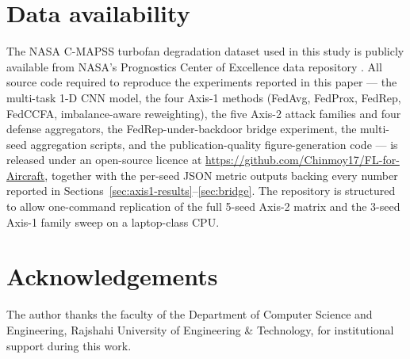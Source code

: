 \documentclass[preprint,12pt,authoryear]{elsarticle}
\begin{document}
\section*{Data availability}
The NASA C-MAPSS turbofan degradation dataset used in this study is
publicly available from NASA's Prognostics Center of Excellence data
repository \citep{Saxena2008CMAPSS}. All source code required to
reproduce the experiments reported in this paper --- the multi-task
1-D CNN model, the four Axis-1 methods (FedAvg, FedProx, FedRep,
FedCCFA, imbalance-aware reweighting), the five Axis-2 attack
families and four defense aggregators, the FedRep-under-backdoor
bridge experiment, the multi-seed aggregation scripts, and the
publication-quality figure-generation code --- is released under
an open-source licence at
\url{https://github.com/Chinmoy17/FL-for-Aircraft}, together with
the per-seed JSON metric outputs backing every number reported in
Sections~\ref{sec:axis1-results}--\ref{sec:bridge}. The repository
is structured to allow one-command replication of the full 5-seed
Axis-2 matrix and the 3-seed Axis-1 family sweep on a laptop-class
CPU.

\section*{Acknowledgements}
The author thanks the faculty of the Department of Computer Science
and Engineering, Rajshahi University of Engineering \& Technology,
for institutional support during this work.


\clearpage


\end{document}
